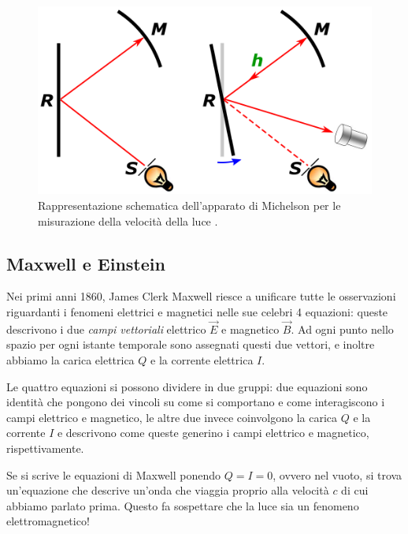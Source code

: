 \documentclass[a4paper,12pt]{article}
\begin{document}
\begin{figure}[ht]
\centering
\includegraphics[width=\textwidth]{Speed_of_light_calculation_using_Foucault's_rotating_mirror.png}
\caption{Rappresentazione schematica dell'apparato di Michelson per le misurazione della velocità della luce \cite[]{aurantiacaSpeedLightCalculation2015}.
}
\label{fig:michelson-apparatus}
\end{figure}

\subsection{Maxwell e Einstein}

Nei primi anni 1860, James Clerk Maxwell riesce a unificare tutte le osservazioni riguardanti i fenomeni elettrici e magnetici nelle sue celebri 4 equazioni: queste descrivono i due \emph{campi vettoriali} elettrico \(\vec{E}\) e magnetico \(\vec{B}\). 
Ad ogni punto nello spazio per ogni istante temporale sono assegnati questi due vettori, e inoltre abbiamo la carica elettrica \(Q\) e la corrente elettrica \(I\). 

Le quattro equazioni si possono dividere in due gruppi: due equazioni sono identità che pongono dei vincoli su come si comportano e come interagiscono i campi elettrico e magnetico, le altre due invece coinvolgono la carica \(Q\) e la corrente \(I\) e descrivono come queste generino i campi elettrico e magnetico, rispettivamente. 

Se si scrive le equazioni di Maxwell ponendo \(Q = I = 0\), ovvero nel vuoto, si trova un'equazione che descrive un'onda che viaggia proprio alla velocità \(c\) di cui abbiamo parlato prima. 
Questo fa sospettare che la luce sia un fenomeno elettromagnetico! 
\end{document}

